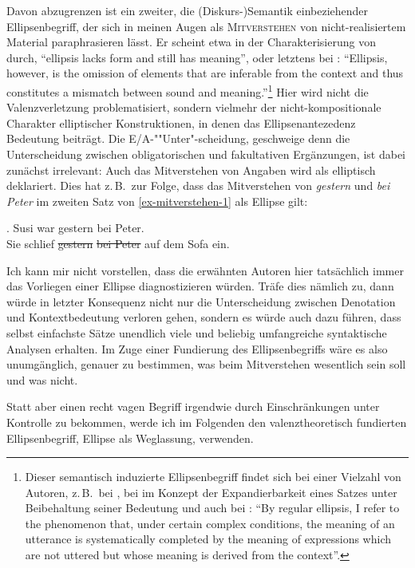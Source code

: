 Davon abzugrenzen ist ein zweiter, die (Diskurs-)Semantik einbeziehender Ellipsenbegriff, der sich in meinen Augen als \textsc{Mitverstehen} von nicht-realisiertem Material paraphrasieren lässt. Er scheint etwa in der Charakterisierung von \citet[1]{Winkler:Schwabe:03} durch, "`ellipsis lacks form and still has meaning"', oder letztens bei \citet[1]{Aelbrecht:10}: "`Ellipsis, however, is the omission of elements that are inferable from the context and thus constitutes a mismatch between sound and meaning."'\footnote{Dieser semantisch induzierte Ellipsenbegriff findet sich bei einer Vielzahl von Autoren, z.\,B.\  bei \citet[175]{Lyons:68}, bei \cite{Kindt:85} im Konzept der Expandierbarkeit eines Satzes unter Beibehaltung seiner Bedeutung und auch bei \citet[52]{Klein:81}: "`By regular ellipsis, I refer to the phenomenon that, under certain complex conditions, the meaning of an utterance is systematically completed by the meaning of expressions which are not uttered but whose meaning is derived from the context"'.} Hier wird nicht die Valenzverletzung problematisiert, sondern vielmehr der nicht-kompositionale Charakter elliptischer Konstruktionen, in denen das Ellipsenantezedenz Bedeutung beiträgt. Die E/A-""Unter"-scheidung, geschweige denn die Unterscheidung zwischen obligatorischen und fakultativen Ergänzungen, ist dabei zunächst irrelevant: Auch das Mitverstehen von Angaben wird als elliptisch deklariert. Dies hat z.\,B.\  zur Folge, dass das Mitverstehen von {\it gestern} und {\it bei Peter} im zweiten Satz von \ref{ex-mitverstehen-1} als Ellipse gilt: 

\ex. \label{ex-mitverstehen-1}Susi war gestern bei Peter. \\ Sie schlief \sout{gestern} \sout{bei Peter} auf dem Sofa ein.

Ich kann mir nicht vorstellen, dass die erwähnten Autoren hier tatsächlich immer das Vorliegen einer Ellipse diagnostizieren würden. Träfe dies nämlich zu, dann würde in letzter Konsequenz nicht nur die Unterscheidung zwischen Denotation und Kontextbedeutung verloren gehen, sondern es würde auch dazu führen, dass selbst einfachste Sätze unendlich viele und beliebig umfangreiche syntaktische Analysen erhalten. Im Zuge einer Fundierung des Ellipsenbegriffs wäre es also unumgänglich, genauer zu bestimmen, was beim Mitverstehen wesentlich sein soll und was nicht.

Statt aber einen recht vagen Begriff irgendwie durch Einschränkungen unter Kontrolle zu bekommen, werde ich im Folgenden den valenztheoretisch fundierten Ellipsenbegriff, Ellipse als Weglassung, verwenden.



